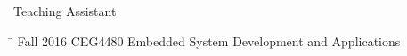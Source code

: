 
\begin{rSection}{Teaching Assistant}
\begin{tabbing}
\hspace{1.0in}\= \kill
    Fall 2016    \>  CEG4480 Embedded System Development and Applications 
\end{tabbing}
\end{rSection}

